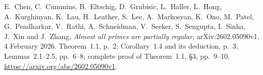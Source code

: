 E.~Chen, C.~Cummins, B.~Eltschig, D.~Grubisic, L.~Haller,
L.~Hong, A.~Kurghinyan, K.~Lau, H.~Leather, S.~Lee,
A.~Markosyan, K.~Ono, M.~Patel, G.~Pendharkar, V.~Rathi,
A.~Schneidman, V.~Seeker, S.~Sengupta, I.~Sinha, J.~Xin
and J.~Zhang,
\emph{Almost all primes are partially regular},
arXiv:2602.05090v1, 4 February 2026.
Theorem~1.1, p.~2; Corollary~1.4 and its deduction, p.~3;
Lemmas~2.1--2.5, pp.~6--8; complete proof of Theorem~1.1,
\S3, pp.~9--10.
\url{https://arxiv.org/abs/2602.05090v1}.

